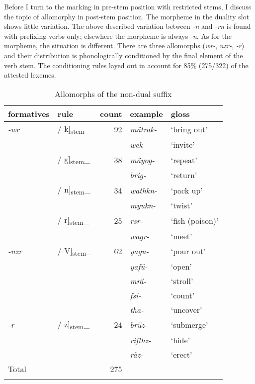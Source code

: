 Before I turn to the  marking in pre-stem position with restricted stems, I discuss the topic of allomorphy in post-stem position. The  morpheme in the duality slot shows little variation. The above described variation between \emph{-n} and \emph{-rn} is found with prefixing verbs only; elsewhere the  morpheme is always \emph{-n}. As for the  morpheme, the situation is different. There are three allomorphs (\emph{wr-}, \emph{nzr-}, \emph{-r}) and their distribution is phonologically conditioned by the final element of the verb stem. The conditioning rules layed out in  account for 85\% (275/322) of the attested  lexemes.

\begin{table}
	\caption{Allomorphs of the non-dual suffix}
	\label{allonondual}
\begin{tabularx}{.8\textwidth}{llrXl}
	\lsptoprule
	{formatives} & {rule} &{count}& {{example}}& {gloss}\\
	\midrule
	\emph{-wr}& / k]\textsubscript{\tiny{stem}}\_&92& \emph{mätrak-}& `bring out'\\
	&&& \emph{wek-}&`invite'\\
	& / g]\textsubscript{\tiny{stem}}\_	&38& \emph{mäyog-}& `repeat'\\
	&&& \emph{brig-}&`return'\\
	& / n]\textsubscript{\tiny{stem}}\_	&34& \emph{wathkn-}& `pack up'\\
	&&& \emph{myukn-}&`twist'\\
	& / r]\textsubscript{\tiny{stem}}\_	&25& \emph{rsr-}& `fish (poison)'\\
	&&& \emph{wagr-}&`meet'\\\midrule
	\emph{-nzr}	& / V]\textsubscript{\tiny{stem}}\_&62& \emph{yagu-}& `pour out'\\
	&&& \emph{yafü-}& `open'\\
	&&& \emph{mrä-}& `stroll'\\
	&&& \emph{fsi-}& `count'\\
	&&& \emph{tha-}& `uncover'\\\midrule
	\emph{-r}& / z]\textsubscript{\tiny{stem}}\_&24& \emph{brüz-}& `submerge'\\
	&&& \emph{rifthz-}& `hide'\\
	&&& \emph{räz-}& `erect'\\\midrule
	{Total}&&275&&\\
	\lspbottomrule
\end{tabularx}%
\end{table}


